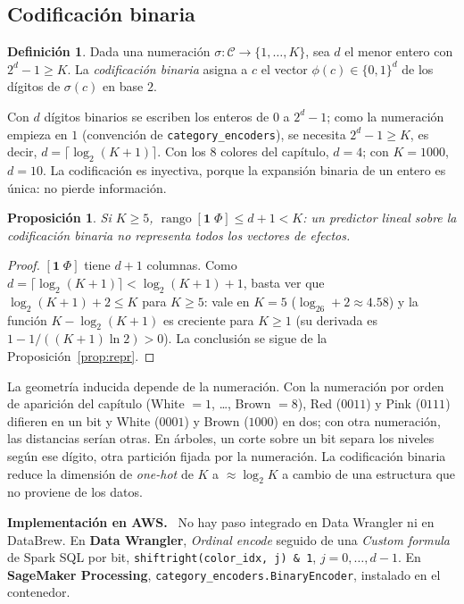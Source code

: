 \documentclass[11pt,a4paper]{article}
\theoremstyle{plain}
\newtheorem{proposicion}[teorema]{Proposición}
\theoremstyle{definition}
\newtheorem{definicion}[teorema]{Definición}
\theoremstyle{remark}
\newcommand{\rango}{\operatorname{rango}}
\newcommand{\1}{\mathbf{1}}
\newenvironment{aws}{\par\medskip\sloppy\noindent\textbf{Implementación en AWS.}\ }{\par\medskip}
\begin{document}
\subsection{Codificación binaria}

\begin{definicion}
Dada una numeración $\sigma:\mathcal C\to\{1,\dots,K\}$, sea $d$ el menor
entero con $2^d-1\ge K$. La \emph{codificación binaria} asigna a $c$ el
vector $\phi(c)\in\{0,1\}^d$ de los dígitos de $\sigma(c)$ en base $2$.
\end{definicion}

Con $d$ dígitos binarios se escriben los enteros de $0$ a $2^d-1$; como
la numeración empieza en $1$ (convención de \texttt{category\_encoders}),
se necesita $2^d-1\ge K$, es decir, $d=\lceil\log_2(K+1)\rceil$. Con los
8 colores del capítulo, $d=4$; con $K=1000$, $d=10$. La codificación es
inyectiva, porque la expansión binaria de un entero es única: no pierde
información.

\begin{proposicion}\label{prop:binaria}
Si $K\ge5$, $\rango[\1\;\Phi]\le d+1<K$: un predictor lineal sobre la
codificación binaria no representa todos los vectores de efectos.
\end{proposicion}

\begin{proof}
$[\1\;\Phi]$ tiene $d+1$ columnas. Como
$d=\lceil\log_2(K+1)\rceil<\log_2(K+1)+1$, basta ver que
$\log_2(K+1)+2\le K$ para $K\ge5$: vale en $K=5$ ($\log_26+2\approx4.58$) y
la función $K-\log_2(K+1)$ es creciente para $K\ge1$ (su derivada es
$1-1/((K+1)\ln 2)>0$). La conclusión se sigue de la
Proposición~\ref{prop:repr}.
\end{proof}

La geometría inducida depende de la numeración. Con la numeración por
orden de aparición del capítulo (White $=1$, \dots, Brown $=8$), Red
($0011$) y Pink ($0111$) difieren en un bit y White ($0001$) y Brown
($1000$) en dos; con otra numeración, las distancias serían otras. En
árboles, un corte sobre un bit separa los niveles según ese dígito, otra
partición fijada por la numeración. La codificación binaria reduce la
dimensión de \emph{one-hot} de $K$ a $\approx\log_2K$ a cambio de una
estructura que no proviene de los datos.

\begin{aws}
No hay paso integrado en Data Wrangler ni en DataBrew. En \textbf{Data
Wrangler}, \emph{Ordinal encode} seguido de una \emph{Custom formula} de
Spark SQL por bit, \texttt{shiftright(color\_idx, j) \& 1},
$j=0,\dots,d-1$. En \textbf{SageMaker Processing},
\texttt{category\_encoders.BinaryEncoder}, instalado en el contenedor.
\end{aws}
\end{document}
